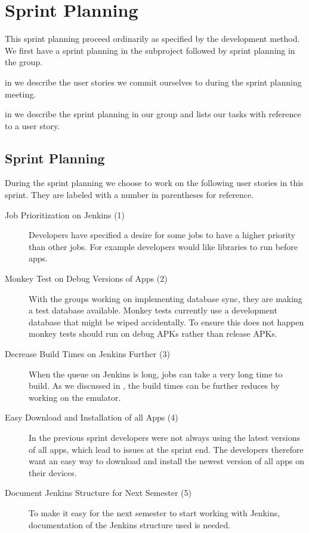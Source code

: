 \chapter{Sprint Planning}\label{chap:s4_sprintplanning}
This sprint planning proceed ordinarily as specified by the development method. We first have a sprint planning in the subproject followed by sprint planning in the group.

\begin{chapterorganization}
  \item in  we describe the user stories we commit ourselves to during the \bd sprint planning meeting.
  \item in  we describe the sprint planning in our group and lists our tasks with reference to a user story.
\end{chapterorganization}

\section{\bdtitle Sprint Planning}\label{sec:S4_bd}
During the \bd sprint planning we choose to work on the following user stories in this sprint. They are labeled with a number in parentheses for reference.


\begin{description}
  \item[Job Prioritization on Jenkins (1)] Developers have specified a desire for some jobs to have a higher priority than other jobs. For example developers would like libraries to run before apps.
  \item[Monkey Test on Debug Versions of Apps (2)] With the \db groups working on implementing database sync, they are making a test database available. Monkey tests currently use a development database that might be wiped accidentally. To ensure this does not happen monkey tests should run on debug APKs rather than release APKs.
  \item[Decrease Build Times on Jenkins Further (3)] When the queue on Jenkins is long, jobs can take a very long time to build. As we discussed in , the build times can be further reduces by working on the emulator.
  \item[Easy Download and Installation of all Apps (4)] In the previous sprint developers were not always using the latest versions of all apps, which lead to issues at the sprint end. The developers therefore want an easy way to download and install the newest version of all apps on their devices.
  \item[Document Jenkins Structure for Next Semester (5)] To make it easy for the next semes\-ter to start working with Jenkins, documentation of the Jenkins structure used is needed.
\end{description}

